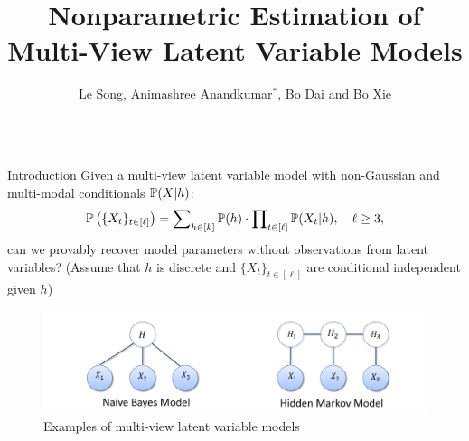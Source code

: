 \documentclass[final,t]{beamer}
\title{\huge Nonparametric Estimation of Multi-View Latent Variable Models\vspace{1.5cm}}
\author{Le Song, Animashree Anandkumar$^*$, Bo Dai and Bo Xie\vspace{0.5cm}}
\institute[gt_cse]{Georgia Institute of Technology, $^*$University of California, Irvine}
\begin{document}
\begin{frame}{} 
  \begin{columns}[T]
    \begin{column}{.3\linewidth}


      \begin{block}{Introduction}
        Given a multi-view latent variable model with \alert{non-Gaussian and multi-modal conditionals} $\mathbb{P}(X|h)$:  
        \begin{eqnarray*}
          \mathbb{P}\left(\{X_t\}_{t \in [\ell]}\right)=\sum\nolimits_{h \in [k]} \mathbb{P}(h) \cdot \prod\nolimits_{t \in [\ell]} \mathbb{P}(X_t|h),\quad \ell\ge 3, 
        \end{eqnarray*}
        can we provably recover model parameters \alert{without} observations from latent variables? 
        (Assume that $h$ is discrete and $\{X_t\}_{t\in[\ell] }$ are conditional independent given $h$)
        \begin{figure}[h!]
        \vspace{-3mm}
        \centering
        \includegraphics[width=\linewidth]{figures/example_mv.pdf} 
        \vspace{-5mm}
        \caption{Examples of multi-view latent variable models}
        \vspace{-5mm}
        \end{figure}
        

\end{block}
\end{column}
\end{columns}
\end{frame}
\end{document}
